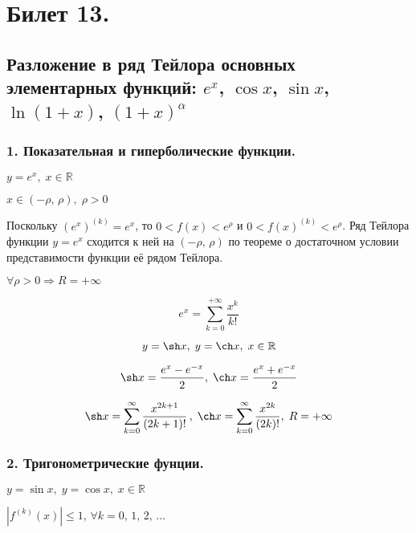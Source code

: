 
\usepackage{upgreek}


\newcommand{\eqdef}{\stackrel{\mathrm{def}}{=}}
\newcommand{\ryad}{\sum^{\infty}_{k = 0}}





\section*{Билет 13.}
\subsection*{Разложение в ряд Тейлора основных элементарных функций: $e^x$, $\cos x$, $\sin x$, $\ln (1 + x)$, $(1 + x)^{\alpha}$ }


\subsubsection*{1. Показательная и гиперболические функции.}



\begin{center}
$y = e^x, \; x \in \mathbb{R}$
\vspace{8pt}

$x \in (-\rho, \, \rho), \; \rho > 0$
\end{center}

Поскольку $(e^x)^{(k)} = e^x $, то $0 < f(x) < e^{\rho}$ и $0 < f(x)^{(k)} < e^{\rho}$. Ряд Тейлора функции $y = e^x$ сходится к ней на $( - \rho, \, \rho)$ по теореме о достаточном условии представимости функции её рядом Тейлора.

$\forall \rho > 0 \Rightarrow R = + \infty$

\[ e^x = \sum^{+\infty}_{k = 0} \frac{x^k}{k!}\]

\[y = \sh x, \; y = \ch x, \; x \in \mathbb{R} \]

\[ \sh x = \frac{e^x - e^{-x}}{2}, \; \ch x = \frac{e^x + e^{-x}}{2} \]

\[ \sh x = \ryad \frac{x^{2k + 1}}{(2k + 1)!} \,, \; \ch x = \ryad \frac{x^{2k}}{(2k)!}, \; R = +\infty\]


\subsubsection*{2. Тригонометрические фунции.}

\begin{center}
$y = \sin x, \; y = \cos x, \; x \in \mathbb{R}$
\vspace{8pt}

$| f^{(k)} (x) | \le 1$, $\forall k = 0, \, 1, \, 2, \, \ldots$
\end{center}
 
